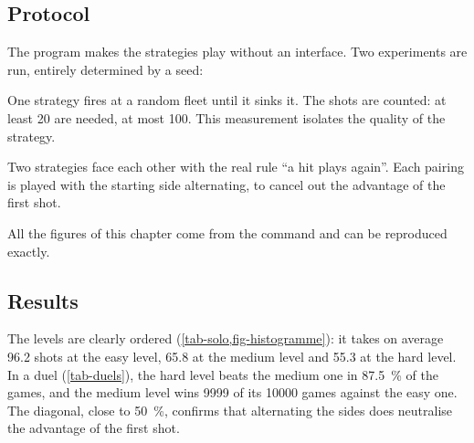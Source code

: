 \subsection{Protocol}

The program  makes the strategies play without an interface.
Two experiments are run, entirely determined by a seed:

\begin{description}[style=nextline, leftmargin=1.2em]
    \item[Solo] One strategy fires at a random fleet until it sinks it. The shots are
          counted: at least 20 are needed, at most 100. This measurement isolates the quality of
          the strategy.
    \item[Duel] Two strategies face each other with the real rule \enquote{a hit plays
              again}. Each pairing is played with the starting side alternating, to cancel out the
          advantage of the first shot.
\end{description}

All the figures of this chapter come from the command
 and can be reproduced exactly.

\subsection{Results}

The levels are clearly ordered (\cref{tab-solo,fig-histogramme}): it takes on average
\num{96.2} shots at the easy level, \num{65.8} at the medium level and \num{55.3} at the hard
level. In a duel (\cref{tab-duels}), the hard level beats the medium one in
\SI{87.5}{\percent} of the games, and the medium level wins \num{9999} of its \num{10000}
games against the easy one. The diagonal, close to \SI{50}{\percent}, confirms that
alternating the sides does neutralise the advantage of the first shot.

